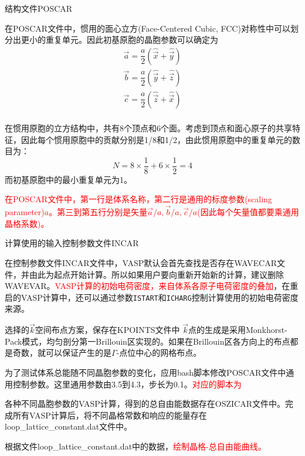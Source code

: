 结构文件\textrm{POSCAR}

在\textrm{POSCAR}文件中，惯用的面心立方\textrm{(Face-Centered Cubic, FCC)}对称性中可以划分出更小的重复单元。因此初基原胞的晶胞参数可以确定为
\begin{displaymath}
	\begin{aligned}
		\vec a =\dfrac{a}2(\hat{\vec x}+\hat{\vec y})\\
		\vec b =\dfrac{a}2(\hat{\vec y}+\hat{\vec z})\\
		\vec c =\dfrac{a}2(\hat{\vec z}+\hat{\vec x})\\
	\end{aligned}
\end{displaymath}

在惯用原胞的立方结构中，共有8个顶点和6个面。考虑到顶点和面心原子的共享特征，因此每个惯用原胞中的贡献分别是1/8和1/2，由此惯用原胞中的重复单元的数目为：
\begin{displaymath}
	N=8\times\dfrac18+6\times\dfrac12=4
\end{displaymath}
而初基原胞中的最小重复单元为1。

\textcolor{red}{在\textrm{POSCAR}文件中，第一行是体系名称，第二行是通用的标度参数\textrm{(scaling parameter)}$a$。第三到第五行分别是矢量$\vec a/a,\vec b/a,\vec c/a$(因此每个矢量值都要乘通用晶格系数)。}

计算使用的输入控制参数文件\textrm{INCAR}

在控制参数文件\textrm{INCAR}文件中，\textrm{VASP}默认会首先查找是否存在\textrm{WAVECAR}文件，并由此为起点开始计算。所以如果用户要向重新开始新的计算，建议删除\textrm{WAVEVAR}。\textcolor{red}{\textrm{VASP}计算的初始电荷密度，来自体系各原子电荷密度的叠加}，在重启的\textrm{VASP}计算中，还可以通过参数\texttt{ISTART}和\texttt{ICHARG}控制计算使用的初始电荷密度来源。

选择的$\vec k$空间布点方案，保存在\textrm{KPOINTS}文件中
$\vec k$点的生成是采用\textrm{Monkhorst-Pack}模式，均匀剖分第一\textrm{Brillouin}区实现的。如果在\textrm{Brillouin}区各方向上的布点都是奇数，就可以保证产生的是$\Gamma$-点位中心的网格布点。

为了测试体系总能随不同晶胞参数的变化，应用\textrm{bash}脚本修改\textrm{POSCAR}文件中通用控制参数。这里通用参数由3.5到4.3，步长为0.1。\textcolor{red}{对应的脚本为}

各种不同晶胞参数的\textrm{VASP}计算，得到的总自由能数据存在\textrm{OSZICAR}文件中。完成所有\textrm{VASP}计算后，将不同晶格常数和响应的能量存在\textrm{loop\_lattice\_constant.dat}文件中。

根据文件\textrm{loop\_lattice\_constant.dat}中的数据，\textcolor{red}{绘制晶格-总自由能曲线。}

